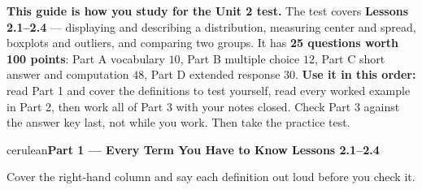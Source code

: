 \documentclass[10pt]{article}
\newcommand{\parthead}[1]{%
  \vspace{6pt}\noindent
  \begin{headlinebox}{cerulean}{\color{white}\bfseries #1}\end{headlinebox}%
  \vspace{4pt}}
\begin{document}
\namedateperiod

\vspace{0.10in}
\begin{remindbox}
\small
\textbf{This guide is how you study for the Unit 2 test.} The test covers
\textbf{Lessons 2.1--2.4} --- displaying and describing a distribution, measuring center and
spread, boxplots and outliers, and comparing two groups. It has \textbf{25 questions worth 100 points}:
Part A vocabulary $10$, Part B multiple choice $12$, Part C short answer and computation $48$,
Part D extended response $30$.
\textbf{Use it in this order:} read Part 1 and cover the definitions to test yourself, read
every worked example in Part 2, then work all of Part 3 with your notes closed. Check Part 3
against the answer key last, not while you work. Then take the practice test.
\end{remindbox}

\parthead{Part 1 --- Every Term You Have to Know \hfill Lessons 2.1--2.4}

\small
Cover the right-hand column and say each definition out loud before you check it.
\end{document}
